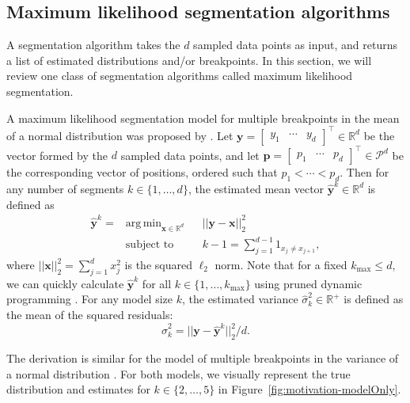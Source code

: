 \documentclass{jsfds} %
\DeclareMathOperator*{\argmin}{arg\,min}
\newcommand{\RR}{\mathbb{R}}
\begin{document}
\subsection{Maximum likelihood segmentation algorithms}

A segmentation algorithm takes the $d$ sampled data points as input,
and returns a list of estimated distributions and/or breakpoints. In
this section, we will review one class of segmentation algorithms
called maximum likelihood segmentation.

A maximum likelihood segmentation model for multiple breakpoints in
the mean of a normal distribution was proposed by
\citet{statistical-approach}. Let $\mathbf y = \left[
  \begin{array}{ccc}
    y_1 & \cdots & y_d
  \end{array}
\right]^\intercal \in \RR^d$ be the vector formed by the $d$
sampled data points, and let  $\mathbf p = \left[
  \begin{array}{ccc}
    p_1 & \cdots & p_d
  \end{array}
\right]^\intercal \in \mathcal P^d$ be the corresponding vector of
positions, ordered such that $p_1 < \cdots < p_d$. Then for any number
of segments $k\in\{1, \dots, d\}$, the estimated mean vector $\mathbf{\hat
  y}^k\in\RR^d$ is defined as
\begin{equation}
\label{eq:yhat^k}
\begin{aligned}
\mathbf{\hat  y}^k = &\argmin_{\mathbf x \in \RR^d} &&  ||\mathbf y - \mathbf x||^2_2
\\
&\text{subject to} && k-1=\sum_{j=1}^{d-1} 1_{x_j\neq x_{j+1}},
\end{aligned}
\end{equation}
where $||\mathbf x||^2_2=\sum_{j=1}^d x_j^2$ is the squared $\ell_2$
norm. Note that for a fixed $k_{\text{max}}\leq d$, we can quickly
calculate $\mathbf{\hat y}^k$ for all $k\in\{1,\dots,k_{\text{max}}\}$
using pruned dynamic programming \citep{pruned-dp}. For any model size
$k$, the estimated variance $\hat \sigma^2_k\in\RR^+$ is defined
as the mean of the squared residuals:
\begin{equation}
  \label{eq:sigmahat}
  \hat \sigma_k^2 = ||\mathbf y - \mathbf{\hat y}^k||^2_2/d.
\end{equation}

The derivation is similar for the model of multiple breakpoints in the
variance of a normal distribution \citep{pelt,segmentor}. For both
models, we visually represent the true distribution and estimates for
$k\in\{2, \dots, 5\}$ in Figure~\ref{fig:motivation-modelOnly}. 
\end{document}
